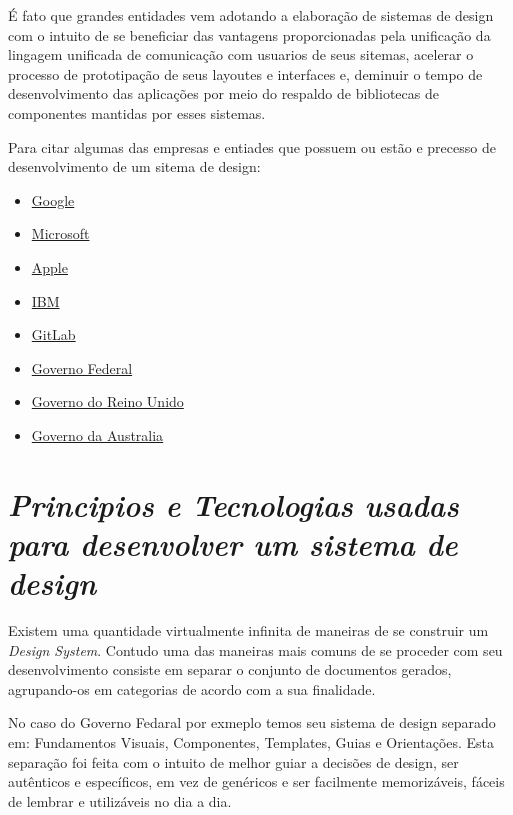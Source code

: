   É fato que grandes entidades vem adotando a elaboração de sistemas de design com o intuito de se beneficiar das vantagens proporcionadas pela unificação da lingagem unificada de comunicação com usuarios de seus sitemas, acelerar o processo de prototipação de seus layoutes e interfaces e, deminuir o tempo de desenvolvimento das aplicações por meio do respaldo de bibliotecas de componentes mantidas por esses sistemas.

  Para citar algumas das empresas e entiades que possuem ou estão e precesso de desenvolvimento de um sitema de design:

\begin{itemize}
  \item \href{https://material.io/design/}{Google}
  \item \href{https://www.microsoft.com/design/fluent/#/}{Microsoft}
  \item \href{https://developer.apple.com/design/}{Apple}
  \item \href{https://www.carbondesignsystem.com/}{IBM}
  \item \href{https://www.figma.com/community/plugin/860845891704482356/GitLab}{GitLab}
  \item \href{https://www.gov.br/governodigital/pt-br/transformacao-digital/ferramentas/design-system}{Governo Federal}
  \item \href{https://www.gov.uk/guidance/government-design-principles}{Governo do Reino Unido }
  \item \href{https://designsystem.gov.au/}{Governo da Australia}
\end{itemize}

\section[\textit{Seção}]{\textit{Principios e Tecnologias usadas para desenvolver um sistema de design}}

  Existem uma quantidade virtualmente infinita de maneiras de se construir um \textit{Design System}. Contudo uma das maneiras mais comuns de se proceder com seu desenvolvimento consiste em separar o conjunto de documentos gerados, agrupando-os em categorias de acordo com a sua finalidade.

  No caso do Governo Fedaral por exmeplo temos seu sistema de design separado em: Fundamentos Visuais, Componentes, Templates, Guias e Orientações. Esta separação foi feita com o intuito de melhor guiar a decisões de design, ser autênticos e específicos, em vez de genéricos e ser facilmente memorizáveis, fáceis de lembrar e utilizáveis no dia a dia. \cite{design_gov_federal}

